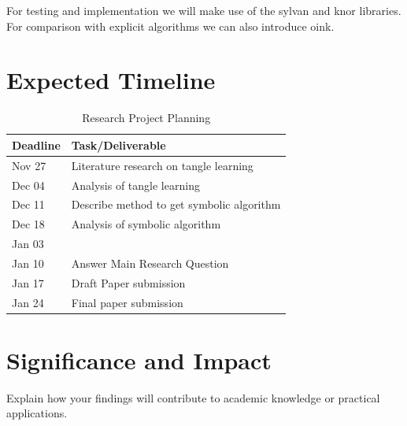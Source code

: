 \documentclass[11pt, a4paper]{article}
\begin{document}

For testing and implementation we will make use of the sylvan and knor libraries. For comparison with explicit algorithms we can also introduce oink.

\section{Expected Timeline}
\label{sec:timeline}
\begin{table}[htbp]
    \centering
    \caption{Research Project Planning}
    \label{tab:research_planning}
    \begin{tabularx}{\textwidth}{l X}
        \toprule
        \textbf{Deadline} & \textbf{Task/Deliverable} \\
        \midrule
        Nov 27 & Literature research on tangle learning \\
        Dec 04 & Analysis of tangle learning \\
        Dec 11 & Describe method to get symbolic algorithm \\
        Dec 18 & Analysis of symbolic algorithm \\
        Jan 03 &  \\
        Jan 10 & Answer Main Research Question \\
        Jan 17 & Draft Paper submission \\
        Jan 24 & Final paper submission \\
        \bottomrule
    \end{tabularx}
\end{table}

\section{Significance and Impact}
\label{sec:impact}
Explain how your findings will contribute to academic knowledge or practical applications.
\end{document}
